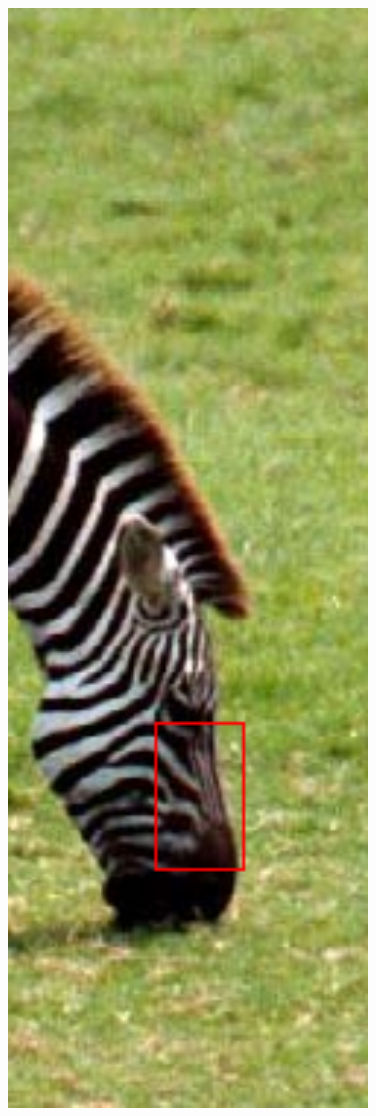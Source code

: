 \documentclass[review,numbers,sort&compress]{elsarticle}  %
\begin{document}
\begin{figure}[t]
{\begin{minipage}[b]{0.12\textwidth}
                \includegraphics[width=1\textwidth]{compareImage/zebra_crop_ORI.png} \\

\end{minipage}}
\end{figure}
\end{document}
